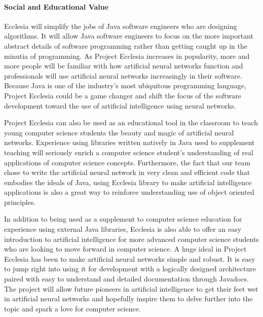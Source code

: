 \documentclass[letterpaper, 10pt]{article}
\begin{document}
	\paragraph{Social and Educational Value} 
	Ecclesia will simplify the jobs of Java software engineers who are designing algorithms. It will allow Java software engineers to focus on the more important abstract details of software programming rather than getting caught up in the minutia of programming. As Project Ecclesia increases in popularity, more and more people will be familiar with how artificial neural networks function and professionals will use artificial neural networks increasingly in their software. Because Java is one of the industry's most ubiquitous programming language, Project Ecclesia could be a game changer and shift the focus of the software development toward the use of artificial intelligence using neural networks.
	
	Project Ecclesia can also be used as an educational tool in the classroom to teach young computer science students the beauty and magic of artificial neural networks. Experience using libraries written natively in Java used to supplement teaching will seriously enrich a computer science student's understanding of real applications of computer science concepts. Furthermore, the fact that our team chose to write the artificial neural network in very clean and efficient code that embodies the ideals of Java, using Ecclesia library to make artificial intelligence applications is also a great way to reinforce understanding use of object oriented principles.
	
	In addition to being used as a supplement to computer science education for experience using external Java libraries, Ecclesia is also able to offer an easy introduction to artificial intelligence for more advanced computer science students who are looking to move forward in computer science. A huge ideal in Project Ecclesia has been to make artificial neural networks simple and robust. It is easy to jump right into using it for development with a logically designed architecture paired with easy to understand and detailed documentation through Javadocs. The project will allow future pioneers in artificial intelligence to get their feet wet in artificial neural networks and hopefully inspire them to delve further into the topic and spark a love for computer science.
	
\end{document}
